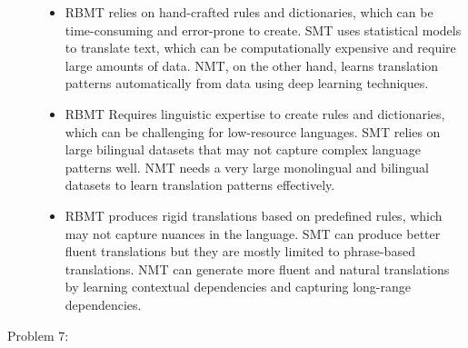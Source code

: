 \documentclass[10pt]{article}
\begin{document}
\begin{description}
\begin{itemize}
    \item RBMT relies on hand-crafted rules and dictionaries, which can be time-consuming and error-prone to create.
    SMT uses statistical models to translate text, which can be computationally expensive and require large amounts of data.
    NMT, on the other hand, learns translation patterns automatically from data using deep learning techniques.
    \item RBMT Requires linguistic expertise to create rules and dictionaries, which can be challenging for low-resource languages.
    SMT relies on large bilingual datasets that may not capture complex language patterns well.
    NMT needs a very large monolingual and bilingual datasets to learn translation patterns effectively.
    \item RBMT produces rigid translations based on predefined rules, which may not capture nuances in the language.
    SMT can produce better fluent translations but they are mostly limited to phrase-based translations.
    NMT can generate more fluent and natural translations by learning contextual dependencies and capturing long-range dependencies.
\end{itemize}

\pagebreak

\item[Problem 7:] \hfill %


\end{description}
\end{document}
